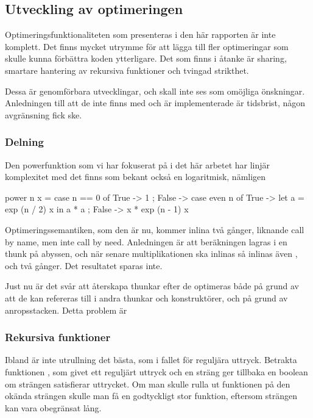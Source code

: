 \documentclass[Rapport]{subfiles}
\begin{document}
\subsection{Utveckling av optimeringen}

Optimeringsfunktionaliteten som presenteras i den här rapporten är inte
komplett. Det finns mycket utrymme för att lägga till fler optimeringar
som skulle kunna förbättra koden ytterligare. Det som finns i åtanke är
sharing, smartare hantering av rekursiva funktioner och tvingad strikthet.

Dessa är genomförbara utvecklingar, och skall inte ses som omöjliga önskningar.
Anledningen till att de inte finns med och är implementerade är tidsbrist,
någon avgränsning fick ske.

\subsubsection{Delning}
Den powerfunktion som vi har fokuserat på i det här arbetet har linjär
komplexitet med det finns som bekant också en logaritmisk, nämligen

\begin{codeEx}
power n x = case n == 0 of
    { True  -> 1
    ; False -> case even n of
        { True  -> let a = exp (n / 2) x 
                   in  a * a
        ; False -> x * exp (n - 1) x
        }
    }
\end{codeEx}

Optimeringssemantiken, som den är nu, kommer inlina  två gånger,
liknande call by name, men inte call by need. Anledningen är att beräkningen
 lagras i en thunk på abyssen, och när senare multiplikationen ska
inlinas så inlinas även , och två gånger. Det resultatet sparas
inte.

    Just nu är det svår att återskapa thunkar efter de optimeras både på grund
av att de kan refereras till i andra thunkar och konstruktörer, och på grund
av anropsstacken. Detta problem är 

\subsubsection{Rekursiva funktioner}


Ibland är inte utrullning det bästa, som i fallet för reguljära uttryck.
Betrakta funktionen , som givet
ett reguljärt uttryck och en sträng ger tillbaka en boolean om strängen
satisfierar uttrycket. Om man skulle rulla ut funktionen på den okända strängen
skulle man få en godtyckligt stor funktion, eftersom strängen kan vara 
obegränsat lång.
\end{document}
